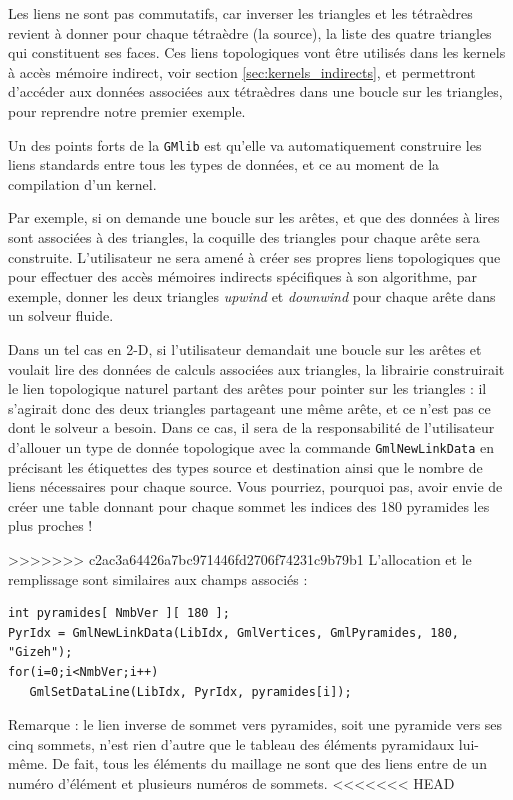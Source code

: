 \documentclass[a4paper,12pt]{article}
\begin{document}
Les liens ne sont pas commutatifs, car inverser les triangles et les tétraèdres revient à donner pour chaque tétraèdre (la source), la liste des quatre triangles qui constituent ses faces.
Ces liens topologiques vont être utilisés dans les kernels à accès mémoire indirect, voir section \ref{sec:kernels_indirects}, et permettront d'accéder aux données associées aux tétraèdres dans une boucle sur les triangles, pour reprendre notre premier exemple.

Un des points forts de la {\tt GMlib} est qu'elle va automatiquement construire les liens standards entre tous les types de données, et ce au moment de la compilation d'un kernel.

Par exemple, si on demande une boucle sur les arêtes, et que des données à lires sont associées à des triangles, la coquille des triangles pour chaque arête sera construite.
L'utilisateur ne sera amené à créer ses propres liens topologiques que pour effectuer des accès mémoires indirects spécifiques à son algorithme, par exemple, donner les deux triangles \emph{upwind} et \emph{downwind} pour chaque arête dans un solveur fluide.

Dans un tel cas en 2-D, si l'utilisateur demandait une boucle sur les arêtes et voulait lire des données de calculs associées aux triangles, la librairie construirait le lien topologique naturel partant des arêtes pour pointer sur les triangles : il s'agirait donc des deux triangles partageant une même arête, et ce n'est pas ce dont le solveur a besoin.
Dans ce cas, il sera de la responsabilité de l'utilisateur d'allouer un type de donnée topologique avec la commande {\tt GmlNewLinkData} en précisant les étiquettes des types source et destination ainsi que le nombre de liens nécessaires pour chaque source.
Vous pourriez, pourquoi pas, avoir envie de créer une table donnant pour chaque sommet les indices des 180 pyramides les plus proches !

>>>>>>> c2ac3a64426a7bc971446fd2706f74231c9b79b1
L'allocation et le remplissage sont similaires aux champs associés :

\begin{tt}
\begin{verbatim}
int pyramides[ NmbVer ][ 180 ];
PyrIdx = GmlNewLinkData(LibIdx, GmlVertices, GmlPyramides, 180, "Gizeh");
for(i=0;i<NmbVer;i++)
   GmlSetDataLine(LibIdx, PyrIdx, pyramides[i]);
\end{verbatim}
\end{tt}
\normalfont

Remarque : le lien inverse de sommet vers pyramides, soit une pyramide vers ses cinq sommets, n'est rien d'autre que le tableau des éléments pyramidaux lui-même.
De fait, tous les éléments du maillage ne sont que des liens entre de un numéro d'élément et plusieurs numéros de sommets.
<<<<<<< HEAD
\end{document}
